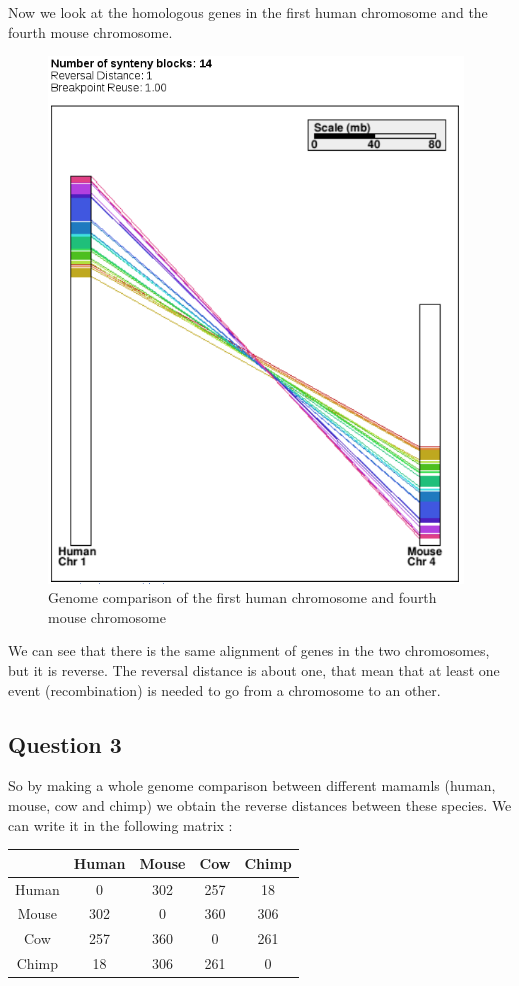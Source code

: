 \documentclass[]{article}
\theoremstyle{definition}
\begin{document}
Now we look at the homologous genes in the first human chromosome and the fourth mouse chromosome.
\begin{figure}[H]
	\includegraphics*[width = 11cm]{../H1_M4.png}
	\caption{\label{h1_m4} Genome comparison of the first human chromosome and fourth mouse chromosome }
\end{figure}
	We can see that there is the same alignment of genes in the two chromosomes, but it is reverse. The reversal distance is about one, that mean that at least one event (recombination) is needed to go from a chromosome to an other.   

\subsection{Question 3}

	So by making a whole genome comparison between different mamamls (human, mouse, cow and chimp) we obtain the reverse distances between these species. We can write it in the following matrix :
	\\
	
\begin{tabular}{|*{5}{c|}}
	\hline
	   & Human  & Mouse  & Cow  & Chimp \\
	\hline
	Human  & 0  & 302  & 257  & 18 \\
	\hline
	Mouse  & 302  & 0  & 360 & 306 \\
	\hline
	Cow  & 257  & 360 & 0 & 261 \\
	\hline
	Chimp  & 18 & 306 & 261 & 0 \\
	\hline
	
\end{tabular}
 
\end{document}

